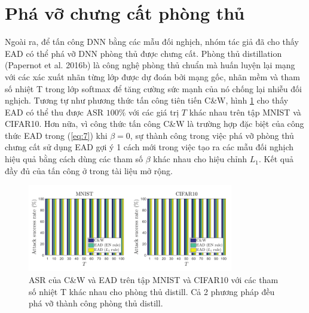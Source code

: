 \section{Phá vỡ chưng cất phòng thủ}
Ngoài ra, để tấn công DNN bằng các mẫu đối nghịch, nhóm tác giả đã cho thấy EAD có thể phá vỡ DNN phòng thủ được chưng cất. Phòng thủ distillation (Papernot et al. 2016b) là công nghệ phòng thủ chuẩn mà huấn luyện lại mạng với các xác xuất nhãn từng lớp được dự đoán bởi mạng gốc, nhãn mềm và tham số nhiệt T trong lớp softmax để tăng cường sức mạnh của nó chống lại nhiễu đối nghịch. Tương tự như phương thức tấn công tiên tiến C\&W, hình \ref{fig:fg_03} cho thấy EAD có thể thu được ASR $100\%$ với các giá trị $T$ khác nhau trên tập MNIST và CIFAR10. Hơn nữa, vì công thức tấn công C\&W là trường hợp đặc biệt của công thức EAD trong (\ref{eq:7}) khi $\beta = 0$, sự thành công trong việc phá vỡ phòng thủ chưng cất sử dụng EAD gợi ý 1 cách mới trong việc tạo ra các mẫu đối nghịch hiệu quả bằng cách dùng các tham số  $\beta$ khác nhau cho hiệu chỉnh $L_1$. Kết quả đầy đủ của tấn công ở trong tài liệu mở rộng.

\begin{figure}[H] %
    \centering %
    \includegraphics[width=0.8\textwidth]{assets/fig_3.png} 
    \caption{ASR của C\&W và EAD trên tập MNIST và CIFAR10 với các tham số nhiệt T khác nhau cho phòng thủ distill. Cả 2 phương pháp đều phá vỡ thành công phòng thủ distill.} %
    \label{fig:fg_03}
\end{figure}
